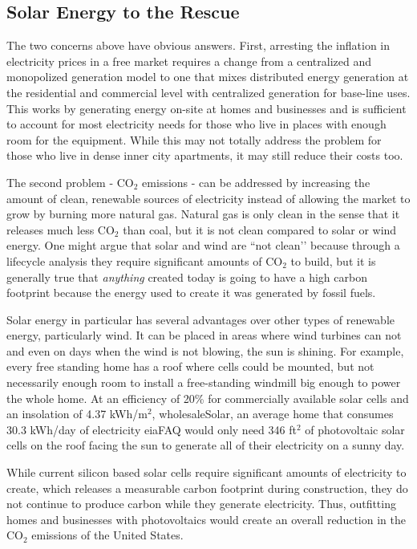 \subsection{Solar Energy to the Rescue}
The two concerns above have obvious answers. First, arresting the inflation in 
electricity prices in a free market requires a change from a centralized and 
monopolized generation model to one that mixes distributed energy generation at 
the residential and commercial level with centralized generation for base-line 
uses. This works by generating energy on-site at homes and businesses and is 
sufficient to account for most electricity needs for those who live in places 
with enough room for the equipment. While this may not totally address the 
problem for those who live in dense inner city apartments, it may still reduce 
their costs too.

The second problem - CO$_2$ emissions - can be addressed by increasing the amount 
of clean, renewable sources of electricity instead of allowing the market to 
grow by burning more natural gas. Natural gas is only clean in the sense that 
it releases much less CO$_2$ than coal, but it is not clean compared to solar or 
wind energy. One might argue that solar and wind are ``not clean’’ because 
through a lifecycle analysis they require significant amounts of CO$_2$ to build, 
but it is generally true that \textit{anything} created today is going to have 
a high carbon footprint because the energy used to create it was generated by 
fossil fuels.

Solar energy in particular has several advantages over other types of renewable 
energy, particularly wind. It can be placed in areas where wind turbines can not
and even on days when the wind is not blowing, the sun is shining. For example, 
every free standing home has a roof where cells could be mounted, but not 
necessarily enough room to install a free-standing windmill big enough to power 
the whole home. At an efficiency of 20\% for commercially available solar cells 
and an insolation of 4.37 kWh/m$^2$, \cite{jay}{wholesaleSolar}, an average home that
consumes 30.3 kWh/day of electricity \cite{jay}{eiaFAQ} would only need 346 ft$^2$ of
photovoltaic solar cells on the roof facing the sun to generate all of their 
electricity on a sunny day.

While current silicon based solar cells require significant amounts of 
electricity to create, which releases a measurable carbon footprint during 
construction, they do not continue to produce carbon while they generate 
electricity. Thus, outfitting homes and businesses with photovoltaics would
create an overall reduction in the CO$_2$ emissions of the United States.

